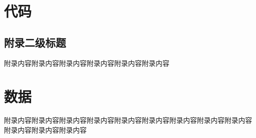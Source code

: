 \appendix
\section{代码}

\subsection{附录二级标题}
附录内容附录内容附录内容附录内容附录内容附录内容

\section{数据}
附录内容附录内容附录内容附录内容附录内容附录内容附录内容附录内容附录内容附录内容附录内容附录内容